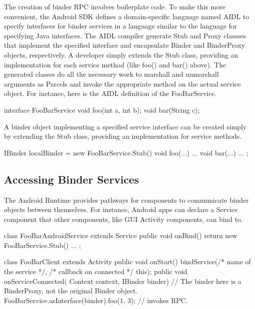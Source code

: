 \documentclass[prodmode]{acmlarge}
\begin{document}
The creation of binder RPC involves boilerplate code. To make this more convenient, the Android SDK defines a domain-specific language named AIDL to specify interfaces for binder services in a language similar to the language for specifying Java interfaces. The AIDL compiler generate Stub and Proxy classses that implement the specified interface and encapsulate Binder and BinderProxy objects, respectively. A developer simply extends the Stub class, providing an implementation for each service method (like foo() and bar() above). The generated classes do all the necessary work to marshall and unmarshall arguments as Parcels and invoke the appropriate method on the actual service object. For instance, here is the AIDL definition of the FooBarService.

\begin{snippet}
interface FooBarService { void foo(int a, int b); void bar(String c); }
\end{snippet}

A binder object implementing a specified service interface can be created simply by extending the Stub class, providing an implementation for service methods.

\begin{snippet}
IBinder localBinder = new FooBarService.Stub() { void foo(...) { ... }
                                                 void bar(...) { ... } };
\end{snippet}

\subsection{Accessing Binder Services}
The Android Runtime provides pathways for components to communicate binder objects between themselves. For instance, Android apps can declare a Service component that other components, like GUI Activity components, can bind to.

\begin{snippet}
class FooBarAndroidService extends Service {
  public void onBind() { return new FooBarService.Stub() { ... }; }
}

class FooBarClient extends Activity {
  public void onStart() { bindService(/* name of the service */,
                                      /* callback on connected */ this);
  }
  public void onServiceConnected(
    Context context, IBinder binder) {
    // The binder here is a BinderProxy, not the original Binder object.
    FooBarService.asInterface(binder).foo(1, 3);  // invokes RPC.
  }
}
\end{snippet}
\end{document}

